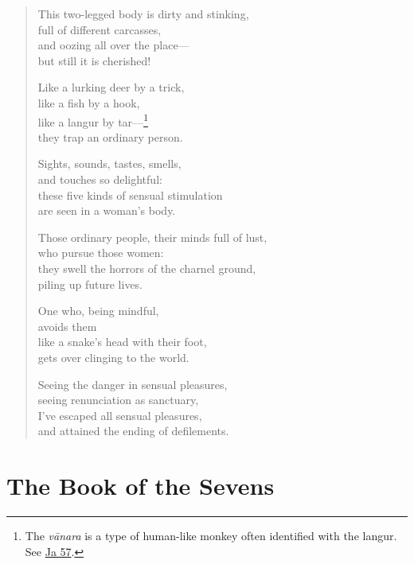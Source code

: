 \documentclass[12pt,openany]{book}%
\let\oldcontentsline\contentsline
\newcommand{\nopagecontentsline}[3]{\oldcontentsline{#1}{#2}{}}
\begin{document}
\begin{verse}%
This two-legged body is dirty and stinking, \\
full of different carcasses, \\
and oozing all over the place—\\
but still it is cherished! 

Like a lurking deer by a trick, \\
like a fish by a hook, \\
like a langur by tar—\footnote{The \textit{\textsanskrit{vānara}} is a type of human-like monkey often identified with the langur. See \href{https://suttacentral.net/ja57/en/sujato}{Ja 57}. } \\
they trap an ordinary person. 

Sights, sounds, tastes, smells, \\
and touches so delightful: \\
these five kinds of sensual stimulation \\
are seen in a woman’s body. 

Those ordinary people, their minds full of lust, \\
who pursue those women: \\
they swell the horrors of the charnel ground, \\
piling up future lives. 

One who, being mindful, \\
avoids them \\
like a snake’s head with their foot, \\
gets over clinging to the world. 

Seeing the danger in sensual pleasures, \\
seeing renunciation as sanctuary, \\
I’ve escaped all sensual pleasures, \\
and attained the ending of defilements. 

%
\end{verse}

%
\part*{The Book of the Sevens }
\markboth{}{}
\addtocontents{toc}{\let\protect\contentsline\protect\oldcontentsline}
\end{document}
